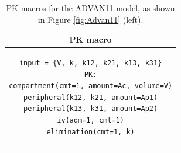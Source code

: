 \begin{table}[h!]
\setlength{\tabcolsep}{15pt}
\begin{center}
\begin{tabular}{c}
  \hline \hline
PK macro \\[-.25ex]
  \hline
\lstset{language=NONMEMdataSet}
\begin{lstlisting}
input = {V, k, k12, k21, k13, k31}
PK:
compartment(cmt=1, amount=Ac, volume=V)
peripheral(k12, k21, amount=Ap1)
peripheral(k13, k31, amount=Ap2)
iv(adm=1, cmt=1)
elimination(cmt=1, k)
\end{lstlisting}
\\
  \hline
\end{tabular}
\caption{PK macros  for the ADVAN11 model, as shown in Figure \ref{fig:Advan11} (left).}
\label{tab:advan11Table}
\end{center}
\end{table}


